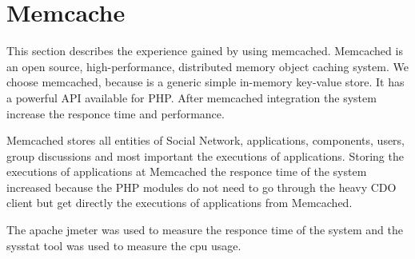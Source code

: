 \section{Memcache}
\label{sec:memcache_implementation}
This section describes the experience gained by using memcached\cite{memcache_url}. Memcached is an open source, high-performance, distributed memory object caching system. We choose memcached, because is a generic simple in-memory key-value store. It has a powerful API available for PHP. After memcached integration the system increase the responce time and performance.

Memcached stores all entities of Social Network, applications, components, users, group discussions and most important the executions of applications. Storing the executions of applications at Memcached the responce time of the system increased because the PHP modules do not need to go through the heavy CDO client but get directly the executions of applications from Memcached.

The apache jmeter\cite{jmeter_url} was used to measure the responce time of the system and the sysstat tool\cite{sysstat_url} was used to measure the cpu usage.  


